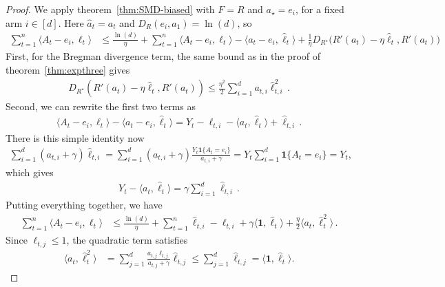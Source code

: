 \documentclass{article}
\theoremstyle{plain}
\theoremstyle{definition}
\newcommand{\hl}{\hat{\ell}\xspace}
\begin{document}
\begin{proof}[Proof]
    We apply theorem~\ref{thm:SMD-biased} with $F=R$ and $a_\star=e_i$,
    for a fixed arm $i\in[d]$.
    Here $\hat a_t=a_t$ and $D_R(e_i,a_1)=\ln(d)$, so
    \begin{align*}
        \sum_{t=1}^n
        \langle A_t-e_i,\ell_t\rangle
         & \leq \frac{\ln(d)}{\eta}
        +
        \sum_{t=1}^n
        \langle A_t-e_i,\ell_t\rangle
        -\langle a_t-e_i,\hl_t\rangle
        +\frac{1}{\eta}
        D_{R^\star}\bigl(R'(a_t)-\eta\hl_t,R'(a_t)\bigr)
    \end{align*}
    First, for the Bregman divergence term, the same
    bound as in the proof of theorem~\ref{thm:expthree} gives
    \begin{align}
        D_{R^\star}(R'(a_t)-\eta\hl_t,R'(a_t))
        \leq \frac{\eta^2}{2} \sum_{i=1}^d a_{t,i} \hl_{t,i}^2\,.
    \end{align}
    Second, we can rewrite the first two terms as
    \begin{align}
        \langle A_t-e_i,\ell_t\rangle
        -\langle a_t-e_i,\hl_t\rangle
        =
        Y_t-\ell_{t,i}-\langle a_t,\hl_t\rangle
        +\hl_{t,i}\,.
    \end{align}
    There is this simple identity now
    \begin{align}
        \sum_{i=1}^d (a_{t,i} + \gamma) \hl_{t,i}
        = \sum_{i=1}^d (a_{t,i} + \gamma) \frac{Y_t \mathbf{1}\{A_t = e_i\}}{a_{t,i} + \gamma}
        = Y_t \sum_{i=1}^d \mathbf{1}\{A_t = e_i\}
        = Y_t,
    \end{align}
    which gives
    \begin{align}
        Y_t - \langle a_t, \hl_t\rangle
        = \gamma \sum_{i=1}^d \hl_{t,i}\,.
    \end{align}
    Putting everything together, we have
    \begin{align*}
        \sum_{t=1}^n
        \langle A_t-e_i,\ell_t\rangle
         & \leq
        \frac{\ln(d)}{\eta}
        +
        \sum_{t=1}^n
        \hl_{t,i}
        -\ell_{t,i}
        + \gamma \langle \mathbf{1},  \hl_{t}\rangle
        +\frac{\eta}{2} \langle a_{t}, \hl_{t}^2\rangle
        \,.
    \end{align*}
    Since $\ell_{t,j}\leq 1$, the quadratic term satisfies
    \begin{align*}
        \langle a_t,\hl_t^2\rangle
         & = \sum_{j=1}^d
        \frac{a_{t,j}\ell_{t,j}}{a_{t,j}+\gamma}\hl_{t,j}
        \leq \sum_{j=1}^d \hl_{t,j}
        = \langle \mathbf{1},\hl_t\rangle.

\end{align*}
\end{proof}
\end{document}
